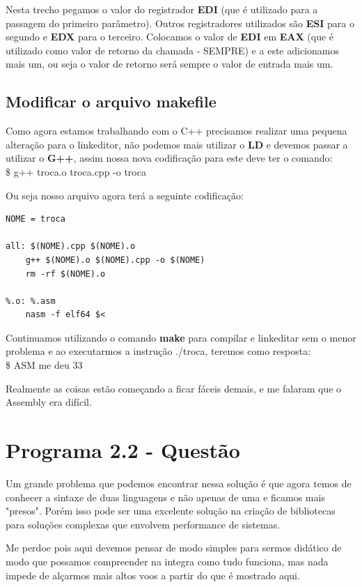 Nesta trecho pegamos o valor do registrador \textbf{EDI} (que é utilizado para a passagem do primeiro parâmetro). Outros registradores utilizados são \textbf{ESI} para o segundo e \textbf{EDX} para o terceiro. Colocamos o valor de \textbf{EDI} em \textbf{EAX} (que é utilizado como valor de retorno da chamada - SEMPRE) e a este adicionamos mais um, ou seja o valor de retorno será sempre o valor de entrada mais um.

\subsection{Modificar o arquivo makefile}
Como agora estamos trabalhando com o C++ precisamos realizar uma pequena alteração para o linkeditor, não podemos mais utilizar o \textbf{LD} e devemos passar a utilizar o \textbf{G++}, assim nossa nova codificação para este deve ter o comando: \\
{\ttfamily\$ g++ troca.o troca.cpp -o troca}

Ou seja nosso arquivo agora terá a seguinte codificação:
\begin{lstlisting}[]
NOME = troca

all: $(NOME).cpp $(NOME).o
	g++ $(NOME).o $(NOME).cpp -o $(NOME)
	rm -rf $(NOME).o

%.o: %.asm
	nasm -f elf64 $<	
\end{lstlisting}

Continuamos utilizando o comando \textbf{make} para compilar e linkeditar sem o menor problema e ao executarmos a instrução {\ttfamily ./troca}, teremos como resposta: \\
{\ttfamily\$ ASM me deu 33}

Realmente as coisas estão começando a ficar fáceis demais, e me falaram que o Assembly era difícil.

\section{Programa 2.2 - Questão}
Um grande problema que podemos encontrar nessa solução é que agora temos de conhecer a sintaxe de duas linguagens e não apenas de uma e ficamos mais "presos". Porém isso pode ser uma excelente solução na criação de bibliotecas para soluções complexas que envolvem performance de sistemas.

Me perdoe pois aqui devemos pensar de modo simples para sermos didático de modo que possamos compreender na integra como tudo funciona, mas nada impede de alçarmos mais altos voos a partir do que é mostrado aqui.

